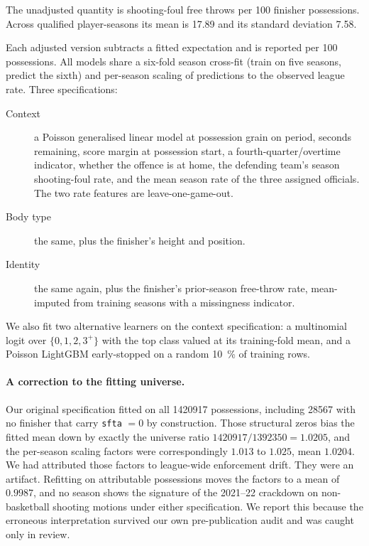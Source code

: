 \documentclass[11pt,a4paper]{article}
\begin{document}
The unadjusted quantity is shooting-foul free throws per 100 finisher
possessions. Across qualified player-seasons its mean is 17.89 and its standard
deviation 7.58.

Each adjusted version subtracts a fitted expectation and is reported per 100
possessions. All models share a six-fold season cross-fit (train on five seasons,
predict the sixth) and per-season scaling of predictions to the observed league
rate. Three specifications:

\begin{description}
\item[Context] a Poisson generalised linear model \citep{nelder1972generalized}
at possession grain on period, seconds remaining, score margin at possession
start, a fourth-quarter/overtime indicator, whether the offence is at home, the
defending team's season shooting-foul rate, and the mean season rate of the three
assigned officials. The two rate features are leave-one-game-out.
\item[Body type] the same, plus the finisher's height and position.
\item[Identity] the same again, plus the finisher's prior-season free-throw
rate, mean-imputed from training seasons with a missingness indicator.
\end{description}

We also fit two alternative learners on the context specification: a multinomial
logit over $\{0,1,2,3^{+}\}$ with the top class valued at its training-fold mean,
and a Poisson LightGBM \citep{ke2017lightgbm} early-stopped on a random
\SI{10}{\percent} of training rows.

\paragraph{A correction to the fitting universe.}
Our original specification fitted on all \num{1420917} possessions, including
\num{28567} with no finisher that carry \texttt{sfta} $= 0$ by construction.
Those structural zeros bias the fitted mean down by exactly the universe ratio
$\num{1420917}/\num{1392350} = 1.0205$, and the per-season scaling factors were
correspondingly $1.013$ to $1.025$, mean $1.0204$. We had attributed those
factors to league-wide enforcement drift. They were an artifact. Refitting on
attributable possessions moves the factors to a mean of $0.9987$, and no season
shows the signature of the 2021--22 crackdown on non-basketball shooting motions
under either specification. We report this because the erroneous interpretation
survived our own pre-publication audit and was caught only in review.
\end{document}

